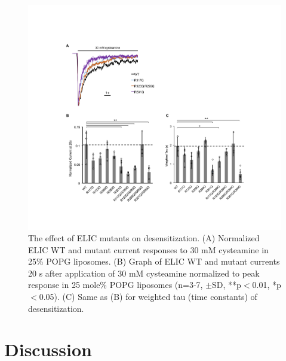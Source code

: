 \begin{figure}

\includegraphics[width=\linewidth]{./pandoc_test/media/image7.pdf}

\caption[The effect of ELIC mutants on desensitization.] {The effect of ELIC mutants on desensitization. (A) Normalized ELIC WT and mutant current responses to 30 mM cysteamine in 25\% POPG liposomes. (B) Graph of ELIC WT and mutant currents 20 s after application of 30 mM cysteamine normalized to peak response in 25 mole\% POPG liposomes (n=3-7, $\pm$SD, **p$<$0.01, *p$<$0.05). (C) Same as (B) for weighted tau (time constants) of desensitization.} 
\label{fig:eight}

\end{figure}

\section{Discussion}

